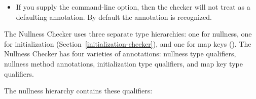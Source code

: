 \begin{enumerate}
\begin{itemize}
\item
  \label{nullness-jspecifyNullMarkedAlias}%
  If you supply the  command-line option, then the
  checker will not treat  as a defaulting
  annotation. By default the  annotation is recognized.
\end{itemize}

\end{enumerate}



The Nullness Checker uses three separate type hierarchies:  one for nullness,
one for initialization (Section~\ref{initialization-checker}),
and one for map keys ().
The Nullness Checker has four varieties of annotations:  nullness
type qualifiers, nullness method annotations, initialization type qualifiers, and
map key type
qualifiers.


The nullness hierarchy contains these qualifiers:

